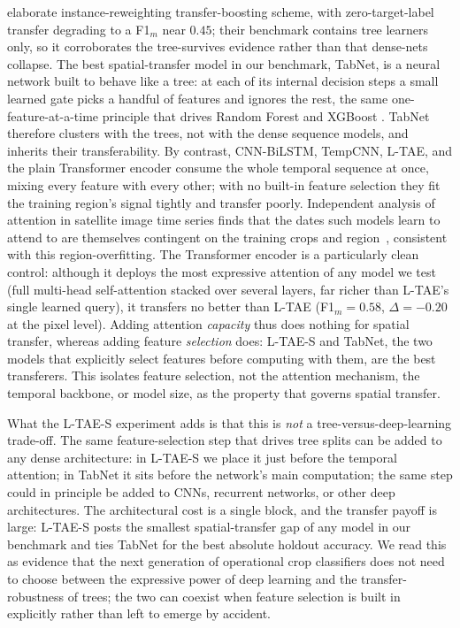 \documentclass[pdflatex,sn-mathphys]{sn-jnl} %
\begin{document}
elaborate instance-reweighting transfer-boosting scheme, with zero-target-label
transfer degrading to a F1$_m$ near $0.45$; their benchmark contains tree learners
only, so it corroborates the tree-survives evidence rather than that
dense-nets collapse. The best spatial-transfer model in our benchmark, TabNet, is a neural
network built to behave like a tree: at each of its internal decision steps a small
learned gate picks a handful of features and ignores the rest, the same
one-feature-at-a-time principle that drives Random Forest and XGBoost
\cite{tabnet_orig}. TabNet therefore clusters with the trees, not with the dense
sequence models, and inherits their transferability. By contrast, CNN-BiLSTM,
TempCNN, L-TAE, and the plain Transformer encoder consume the whole temporal
sequence at once, mixing every feature with every other; with no built-in feature
selection they fit the training region's signal tightly and transfer poorly.
Independent analysis of attention in satellite image time series finds that the dates
such models learn to attend to are themselves contingent on the training crops and
region~\cite{obadic2022}, consistent with this region-overfitting. The Transformer
encoder is a particularly clean control: although it deploys the most expressive
attention of any model we test (full multi-head self-attention stacked over several
layers, far richer than L-TAE's single learned query), it transfers no better than
L-TAE (F1$_m=0.58$, $\Delta=-0.20$ at the pixel level). Adding attention
\emph{capacity} thus does nothing for spatial transfer, whereas adding feature
\emph{selection} does: L-TAE-S and TabNet, the two models that explicitly select
features before computing with them, are the best transferers. This isolates feature
selection, not the attention mechanism, the temporal backbone, or model size, as the
property that governs spatial transfer.

What the L-TAE-S experiment adds is that this is \emph{not} a
tree-versus-deep-learning trade-off. The same feature-selection step that drives tree
splits can be added to any dense architecture: in L-TAE-S we place it just before the
temporal attention; in TabNet it sits before the network's main computation; the same
step could in principle be added to CNNs, recurrent networks, or other deep
architectures. The architectural cost is a single block, and the transfer payoff is
large: L-TAE-S posts the smallest spatial-transfer gap of any model in our benchmark
and ties TabNet for the best absolute holdout accuracy. We read this as evidence that
the next generation of operational crop classifiers does not need to choose between
the expressive power of deep learning and the transfer-robustness of trees; the two
can coexist when feature selection is built in explicitly rather than left to emerge
by accident.
\end{document}
